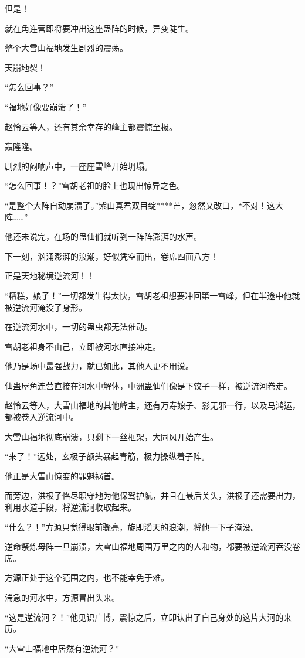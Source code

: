 \begin{this_body}
但是！

就在角连营即将要冲出这座蛊阵的时候，异变陡生。

整个大雪山福地发生剧烈的震荡。

天崩地裂！

“怎么回事？”

“福地好像要崩溃了！”

赵怜云等人，还有其余幸存的峰主都震惊至极。

轰隆隆。

剧烈的闷响声中，一座座雪峰开始坍塌。

“怎么回事！？”雪胡老祖的脸上也现出惊异之色。

“是整个大阵自动崩溃了。”紫山真君双目绽****芒，忽然又改口，“不对！这大阵……”

他还未说完，在场的蛊仙们就听到一阵阵澎湃的水声。

下一刻，汹涌澎湃的浪潮，好似凭空而出，卷席四面八方！

正是天地秘境逆流河！！

“糟糕，娘子！”一切都发生得太快，雪胡老祖想要冲回第一雪峰，但在半途中他就被逆流河淹没了身形。

在逆流河水中，一切的蛊虫都无法催动。

雪胡老祖身不由己，立即被河水直接冲走。

他乃是场中最强战力，就已如此，其他人更不用说。

仙蛊屋角连营直接在河水中解体，中洲蛊仙们像是下饺子一样，被逆流河卷走。

赵怜云等人，大雪山福地的其他峰主，还有万寿娘子、影无邪一行，以及马鸿运，都被卷入逆流河中。

大雪山福地彻底崩溃，只剩下一丝框架，大同风开始产生。

“来了！”远处，玄极子额头暴起青筋，极力操纵着子阵。

他正是大雪山惊变的罪魁祸首。

而旁边，洪极子恪尽职守地为他保驾护航，并且在最后关头，洪极子还需要出力，利用水道手段，将逆流河收取起来。

“什么？！”方源只觉得眼前骤亮，旋即滔天的浪潮，将他一下子淹没。

逆命祭炼母阵一旦崩溃，大雪山福地周围万里之内的人和物，都要被逆流河吞没卷席。

方源正处于这个范围之内，也不能幸免于难。

湍急的河水中，方源冒出头来。

“这是逆流河？！”他见识广博，震惊之后，立即认出了自己身处的这片大河的来历。

“大雪山福地中居然有逆流河？”


\end{this_body}
